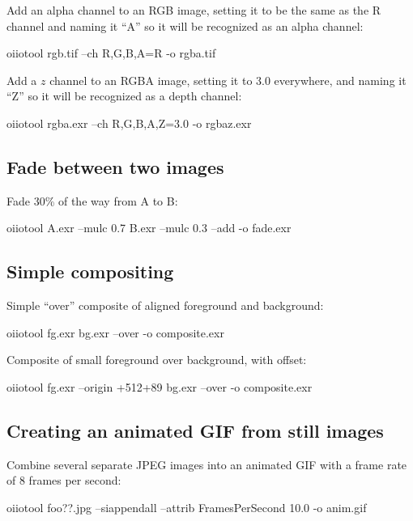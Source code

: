\noindent Add an alpha channel to an RGB image, setting it to be the same
as the R channel and naming it ``A'' so it will be recognized as an alpha channel:
\begin{code}
    oiiotool rgb.tif --ch R,G,B,A=R -o rgba.tif
\end{code}

\noindent Add a $z$ channel to an RGBA image, setting it to 3.0 everywhere,
and naming it ``Z'' so it will be recognized as a depth channel:
\begin{code}
    oiiotool rgba.exr --ch R,G,B,A,Z=3.0 -o rgbaz.exr
\end{code}


\subsection*{Fade between two images}

\noindent Fade 30\% of the way from A to B:

\begin{code}
    oiiotool A.exr --mulc 0.7 B.exr --mulc 0.3 --add -o fade.exr
\end{code}


\subsection*{Simple compositing}

\noindent Simple ``over'' composite of aligned foreground and background:

\begin{code}
    oiiotool fg.exr bg.exr --over -o composite.exr
\end{code}

\noindent Composite of small foreground over background, with offset:

\begin{code}
    oiiotool fg.exr --origin +512+89 bg.exr --over -o composite.exr
\end{code}


\subsection*{Creating an animated GIF from still images}
 

\noindent Combine several separate JPEG images into an animated GIF with
a frame rate of 8 frames per second:

\begin{code}
    oiiotool foo??.jpg --siappendall --attrib FramesPerSecond 10.0 -o anim.gif
\end{code}


